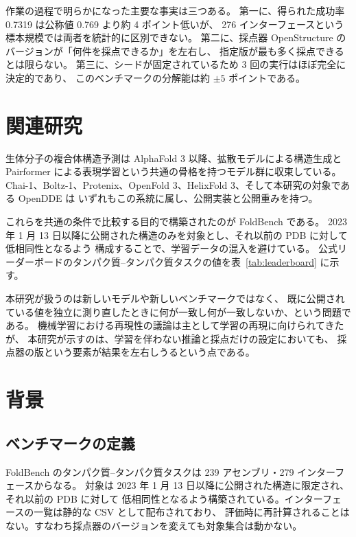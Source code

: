 \documentclass[11pt,a4paper]{article}
\begin{document}
作業の過程で明らかになった主要な事実は三つある。
第一に、得られた成功率 0.7319 は公称値 0.769 より約 4 ポイント低いが、
276 インターフェースという標本規模では両者を統計的に区別できない。
第二に、採点器 OpenStructure のバージョンが「何件を採点できるか」を左右し、
指定版が最も多く採点できるとは限らない。
第三に、シードが固定されているため 3 回の実行はほぼ完全に決定的であり、
このベンチマークの分解能は約 $\pm 5$ ポイントである。

\section{関連研究}

生体分子の複合体構造予測は AlphaFold 3 \cite{af3} 以降、拡散モデルによる構造生成と
Pairformer による表現学習という共通の骨格を持つモデル群に収束している。
Chai-1、Boltz-1、Protenix、OpenFold 3、HelixFold 3、そして本研究の対象である OpenDDE は
いずれもこの系統に属し、公開実装と公開重みを持つ。

これらを共通の条件で比較する目的で構築されたのが FoldBench \cite{foldbench} である。
2023 年 1 月 13 日以降に公開された構造のみを対象とし、それ以前の PDB に対して低相同性となるよう
構成することで、学習データの混入を避けている。
公式リーダーボードのタンパク質--タンパク質タスクの値を表~\ref{tab:leaderboard} に示す。

本研究が扱うのは新しいモデルや新しいベンチマークではなく、
既に公開されている値を独立に測り直したときに何が一致し何が一致しないか、という問題である。
機械学習における再現性の議論は主として学習の再現に向けられてきたが、
本研究が示すのは、学習を伴わない推論と採点だけの設定においても、
採点器の版という要素が結果を左右しうるという点である。

\section{背景}

\subsection{ベンチマークの定義}

FoldBench のタンパク質--タンパク質タスクは 239 アセンブリ・279 インターフェースからなる。
対象は 2023 年 1 月 13 日以降に公開された構造に限定され、それ以前の PDB に対して
低相同性となるよう構築されている。インターフェースの一覧は静的な CSV として配布されており、
評価時に再計算されることはない。すなわち採点器のバージョンを変えても対象集合は動かない。
\end{document}
